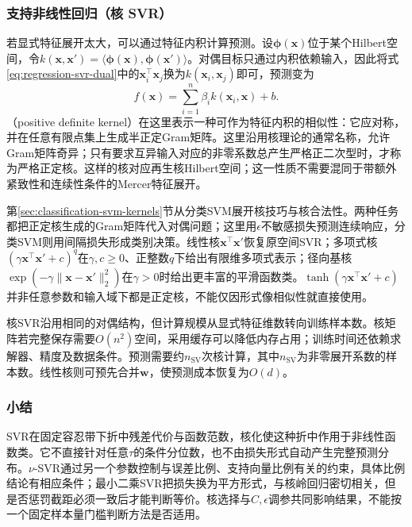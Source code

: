 \subsubsection{支持非线性回归（核 SVR）}
\label{sec:regression-kernel-svr}

若显式特征展开太大，可以通过特征内积计算预测。设$\bm{\phi}(\bm{x})$位于某个Hilbert空间，令$k(\bm{x},\bm{x}')=\langle\bm{\phi}(\bm{x}),\bm{\phi}(\bm{x}')\rangle$。对偶目标只通过内积依赖输入，因此将式\eqref{eq:regression-svr-dual}中的$\bm{x}_i^{\top}\bm{x}_j$换为$k(\bm{x}_i,\bm{x}_j)$即可，预测变为
\begin{equation}
  f(\bm{x})=\sum_{i=1}^{n}\beta_i k(\bm{x}_i,\bm{x})+b.
  \label{eq:regression-kernel-svr-prediction}
\end{equation}
（positive definite kernel）在这里表示一种可作为特征内积的相似性：它应对称，并在任意有限点集上生成半正定Gram矩阵。这里沿用核理论的通常名称，允许Gram矩阵奇异；只有要求互异输入对应的非零系数总产生严格正二次型时，才称为严格正定核。这样的核对应再生核Hilbert空间；这一性质不需要混同于带额外紧致性和连续性条件的Mercer特征展开。

第\ref{sec:classification-svm-kernels}节从分类SVM展开核技巧与核合法性。两种任务都把正定核生成的Gram矩阵代入对偶问题；这里用$\epsilon$不敏感损失预测连续响应，分类SVM则用间隔损失形成类别决策。线性核$\bm{x}^{\top}\bm{x}'$恢复原空间SVR；多项式核$(\gamma\bm{x}^{\top}\bm{x}'+c)^q$在$\gamma,c\geq0$、正整数$q$下给出有限维多项式表示；径向基核$\exp(-\gamma\lVert\bm{x}-\bm{x}'\rVert_2^2)$在$\gamma>0$时给出更丰富的平滑函数类。$\tanh(\gamma\bm{x}^{\top}\bm{x}'+c)$并非任意参数和输入域下都是正定核，不能仅因形式像相似性就直接使用。

核SVR沿用相同的对偶结构，但计算规模从显式特征维数转向训练样本数。核矩阵若完整保存需要$O(n^2)$空间，采用缓存可以降低内存占用；训练时间还依赖求解器、精度及数据条件。预测需要约$n_{\mathrm{SV}}$次核计算，其中$n_{\mathrm{SV}}$为非零展开系数的样本数。线性核则可预先合并$\bm{w}$，使预测成本恢复为$O(d)$。

\subsubsection{小结}

SVR在固定容忍带下折中残差代价与函数范数，核化使这种折中作用于非线性函数类。它不直接针对任意$\tau$的条件分位数，也不由损失形式自动产生完整预测分布。$\nu$-SVR通过另一个参数控制与误差比例、支持向量比例有关的约束，具体比例结论有相应条件；最小二乘SVR把损失换为平方形式，与核岭回归密切相关，但是否惩罚截距必须一致后才能判断等价。核选择与$C,\epsilon$调参共同影响结果，不能按一个固定样本量门槛判断方法是否适用。

